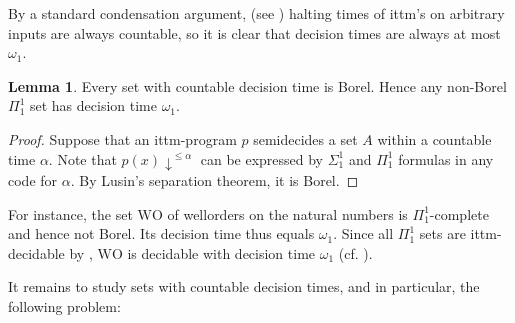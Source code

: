 \documentclass[a4paper,11pt]{amsart}
\theoremstyle{definition}
\newcommand{\WO}{\mathrm{WO}}
\newtheorem{lemma}[fact]{Lemma}
\newtheorem*{problem A}{Problem 1}
\newtheorem*{problem B}{Problem 2}
\theoremstyle{remark}
\begin{document}
By a standard condensation argument, (see \cite[Thm.1.1]{hamkins2000infinite}) halting times of ittm's on arbitrary inputs are always countable, so it is clear that decision times are always at most $\omega_1$. 

\begin{lemma}
\label{long decision times} 
Every set with countable decision time is Borel. 
Hence any non-Borel $\Pi^1_1$ set has decision time $\omega_1$. 
\end{lemma}
\begin{proof} 
Suppose that an ittm-program $p$ semidecides a set $A$ within a countable time $\alpha$. 
Note that $p(x){\downarrow}^{\leq\alpha}$ can be expressed by $\Sigma^1_1$ and $\Pi^1_1$ formulas in any code for $\alpha$. 
By Lusin's separation theorem, it is Borel. 
\end{proof} 

For instance, the set $\WO$ of wellorders on the natural numbers is $\Pi^1_1$-complete and hence not Borel. Its decision time thus equals $\omega_1$.
Since all $\Pi^1_1$ sets are ittm-decidable by \cite[Corollary 2.3]{hamkins2000infinite}, $\WO$ is decidable with decision time $\omega_1$ (cf. \cite[Prop. 32]{carl2020space}). 


\iffalse 
is ittm-decidable, since this is the case for all $\Pi^1_1$ sets by \cite[Corollary 2.3]{hamkins2000infinite}. 
Towards a contradiction, suppose that an ittm-program $p$ semidecides $\WO$ within a countable time $\alpha$. 
Note that $p(x){\downarrow}^{\leq\alpha}$ can be expressed by a $\Sigma^1_1$-formula in any code for $\alpha$. 
This would imply that $\WO$ is a ${\bf\Sigma}^1_1$ set. 
But $\WO$ is ${\bf \Pi}^1_1$-complete and hence not ${\bf \Sigma}^1_1$. 
\fi 

It remains to study sets with countable decision times, and in particular, the following problem: 
\end{document}
